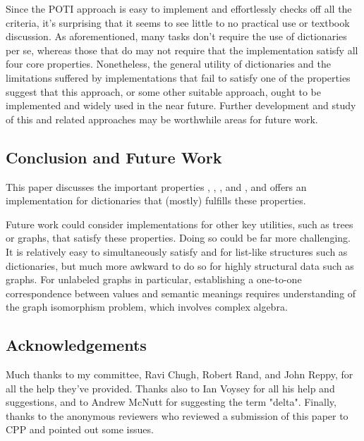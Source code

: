 Since the POTI \cal{} approach is easy to implement and effortlessly checks off all the criteria, it's surprising that it seems to see little to no practical use or textbook discussion.
%
As aforementioned, many tasks don't require the use of dictionaries per se, whereas those that do may not require that the implementation satisfy all four core properties.
%
Nonetheless, the general utility of dictionaries and the limitations suffered by implementations that fail to satisfy one of the properties suggest that this approach,
%
or some other suitable approach, ought to be implemented and widely used in the near future.
%
Further development and study of this and related approaches may be worthwhile areas for future work.

\subsection{Conclusion and Future Work}
\label{sec:Discussion:Conclusion}
%
This paper discusses the important properties \SemTot, \SemInj, \EqDec, and \EzDstr, and offers an implementation for dictionaries that (mostly) fulfills these properties.

Future work could consider implementations for other key utilities, such as trees or graphs, that satisfy these properties.
%
Doing so could be far more challenging.
%
It is relatively easy to simultaneously satisfy \SemTot{} and \SemInj{} for list-like structures such as dictionaries,
%
but much more awkward to do so for highly structural data such as graphs. For unlabeled graphs in particular, establishing a one-to-one correspondence between values and
%
semantic meanings requires understanding of the graph isomorphism problem, which involves complex algebra.

\subsection{Acknowledgements}
\label{sec:Discussion:Ack}
%
Much thanks to my committee, Ravi Chugh, Robert Rand, and John Reppy, for all the help they've provided.
%
Thanks also to Ian Voysey for all his help and suggestions, and to Andrew McNutt for suggesting the term "delta".
%
Finally, thanks to the anonymous reviewers who reviewed a submission of this paper to CPP and pointed out some issues.

